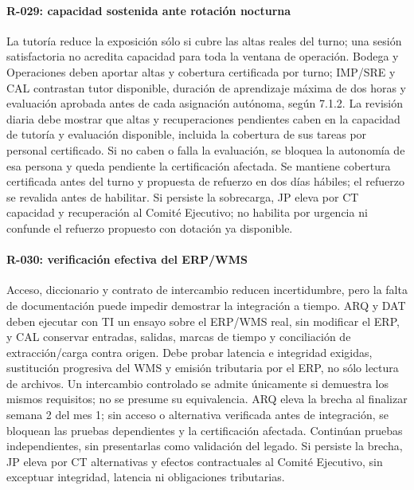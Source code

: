 \paragraph{R-029: capacidad sostenida ante rotación nocturna}
La tutoría reduce la exposición sólo si cubre las altas reales del turno; una
sesión satisfactoria no acredita capacidad para toda la ventana de operación.
Bodega y Operaciones deben aportar altas y cobertura certificada por turno;
IMP/SRE y CAL contrastan tutor disponible, duración de aprendizaje máxima de dos
horas y evaluación aprobada antes de cada asignación autónoma, según 7.1.2.
La revisión diaria debe mostrar que altas y recuperaciones pendientes caben en
la capacidad de tutoría y evaluación disponible, incluida la cobertura de sus
tareas por personal certificado. Si no caben o falla la evaluación, se bloquea
la autonomía de esa persona y queda pendiente la certificación afectada.
Se mantiene cobertura certificada antes del turno y propuesta de refuerzo en dos
días hábiles; el refuerzo se revalida antes de habilitar. Si persiste la sobrecarga,
JP eleva por CT capacidad y recuperación al Comité Ejecutivo; no habilita por
urgencia ni confunde el refuerzo propuesto con dotación ya disponible.

\paragraph{R-030: verificación efectiva del ERP/WMS}
Acceso, diccionario y contrato de intercambio reducen incertidumbre, pero la
falta de documentación puede impedir demostrar la integración a tiempo.
ARQ y DAT deben ejecutar con TI un ensayo sobre el ERP/WMS real, sin modificar
el ERP, y CAL conservar entradas, salidas, marcas de tiempo y conciliación de
extracción/carga contra origen. Debe probar latencia e integridad exigidas,
sustitución progresiva del WMS y emisión tributaria por el ERP, no sólo lectura
de archivos. Un intercambio controlado se admite únicamente si demuestra los
mismos requisitos; no se presume su equivalencia. ARQ eleva la brecha al finalizar
semana 2 del mes 1; sin acceso o alternativa verificada antes de integración,
se bloquean las pruebas dependientes y la certificación afectada. Continúan
pruebas independientes, sin presentarlas como validación del legado. Si persiste
la brecha, JP eleva por CT alternativas y efectos contractuales al Comité
Ejecutivo, sin exceptuar integridad, latencia ni obligaciones tributarias.

